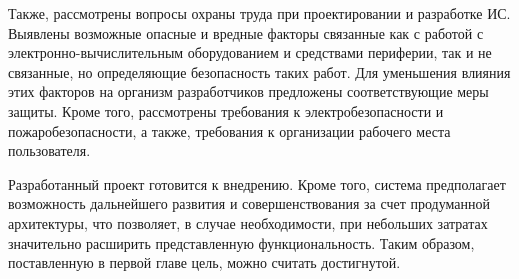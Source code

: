 \documentclass[utf8,usehyperref,12pt]{G7-32}
\begin{document}
Также, рассмотрены вопросы охраны труда при проектировании и разработке ИС. Выявлены возможные опасные и вредные факторы связанные как с работой с электронно-вычислительным оборудованием и средствами периферии, так и не связанные, но определяющие безопасность таких работ. Для уменьшения влияния этих факторов на организм разработчиков предложены соответствующие меры защиты. Кроме того, рассмотрены требования к  электробезопасности и пожаробезопасности, а также,  требования к организации рабочего места пользователя.

Разработанный проект готовится к внедрению. Кроме того, система предполагает возможность дальнейшего развития и совершенствования за счет продуманной архитектуры, что позволяет, в случае необходимости, при небольших затратах значительно расширить представленную функциональность. Таким образом, поставленную в первой главе цель, можно считать достигнутой.
\end{document}
